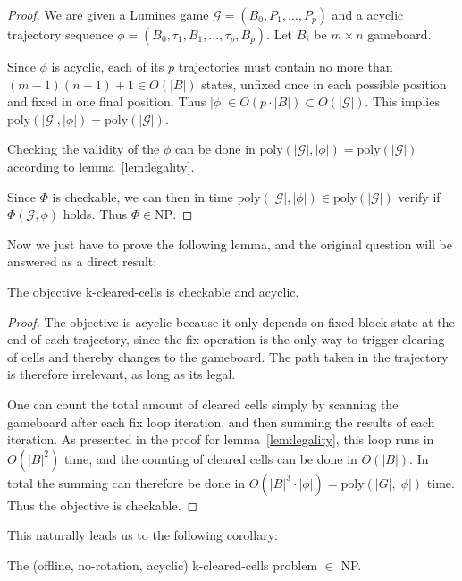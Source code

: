 \begin{proof}
    We are given a Lumines game $\mathcal{G} = (B_0, P_1, \ldots, P_p)$ and a acyclic trajectory sequence $\phi = (B_0, \tau_1, B_1, \ldots ,\tau_p, B_p)$. Let $B_i$ be $m \times n$ gameboard.

    Since $\phi$ is acyclic, each of its $p$ trajectories must contain no more than $(m-1)(n-1) + 1 \in O(|B|)$ states, unfixed once in each possible position and fixed in one final position. Thus $|\phi| \in O(p \cdot |B|) \subset O(|\mathcal{G}|)$. This implies $\text{poly}(|\mathcal{G}|, |\phi|) = \text{poly}(|\mathcal{G}|)$.

    Checking the validity of the $\phi$ can be done in $\text{poly}(|\mathcal{G}|, |\phi|) = \text{poly}(|\mathcal{G}|)$ according to lemma~\ref{lem:legality}.

    Since $\Phi$ is checkable, we can then in time $\text{poly}(|\mathcal{G}|, |\phi|) \in \text{poly}(|\mathcal{G}|)$ verify if $\Phi(\mathcal{G}, \phi)$ holds. Thus $\Phi \in \text{NP}$.
\end{proof}

Now we just have to prove the following lemma, and the original question will be answered as a direct result:\\

\begin{lem}
The objective k-cleared-cells is checkable and acyclic.
\end{lem}

\begin{proof}
The objective is acyclic because it only depends on fixed block state at the end of each trajectory, since the fix operation is the only way to trigger clearing of cells and thereby changes to the gameboard. The path taken in the trajectory is therefore irrelevant, as long as its legal. 

One can count the total amount of cleared cells simply by scanning the gameboard after each fix loop iteration, and then summing the results of each iteration. As presented in the proof for lemma~\ref{lem:legality}, this loop runs in $O(|B|^2)$ time, and the counting of cleared cells can be done in $O(|B|)$. In total the summing can therefore be done in $O(|B|^3 \cdot |\phi|) = \text{poly}(|G|, |\phi|)$ time. Thus the objective is checkable.
\end{proof}

This naturally leads us to the following corollary:\\

\begin{cor}
\label{cor:np}
The (offline, no-rotation, acyclic) k-cleared-cells problem $\in$ NP.
\end{cor}
